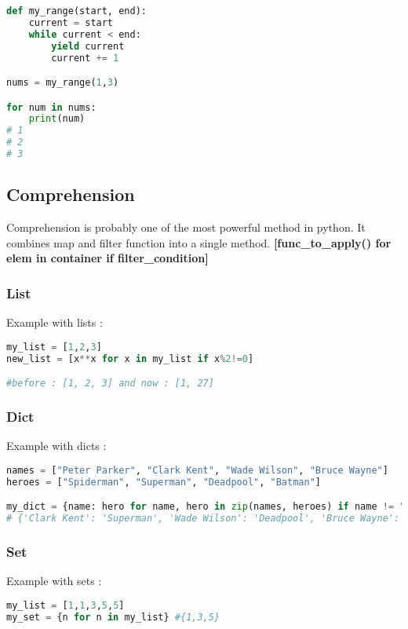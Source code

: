 \documentclass[a4paper, 12pt, titlepage]{scrartcl} %
\begin{document}
\begin{lstlisting}[language=Python]
def my_range(start, end):
    current = start
    while current < end:
        yield current
        current += 1

nums = my_range(1,3)

for num in nums:
    print(num)
# 1
# 2
# 3
\end{lstlisting} \vspace{5mm}

\vspace{5mm}

\subsection{Comprehension}
\label{Comprehension}
Comprehension is probably one of the most powerful method in python. It combines map and filter function into a single method. \textbf{[func\_to\_apply() for elem in container if filter\_condition]} 

\subsubsection{List}
Example with lists :
\begin{lstlisting}[language=Python]
my_list = [1,2,3]
new_list = [x**x for x in my_list if x%2!=0]

#before : [1, 2, 3] and now : [1, 27]
\end{lstlisting}\vspace{5mm}

\subsubsection{Dict}
Example with dicts :
\begin{lstlisting}[language=Python]
names = ["Peter Parker", "Clark Kent", "Wade Wilson", "Bruce Wayne"]
heroes = ["Spiderman", "Superman", "Deadpool", "Batman"]

my_dict = {name: hero for name, hero in zip(names, heroes) if name != "Peter Parker"}
# {'Clark Kent': 'Superman', 'Wade Wilson': 'Deadpool', 'Bruce Wayne': 'Batman'}
\end{lstlisting} \vspace{5mm}

\subsubsection{Set}
Example with sets :
\begin{lstlisting}[language=Python]
my_list = [1,1,3,5,5]
my_set = {n for n in my_list} #{1,3,5}
\end{lstlisting} \vspace{5mm}
\end{document}
